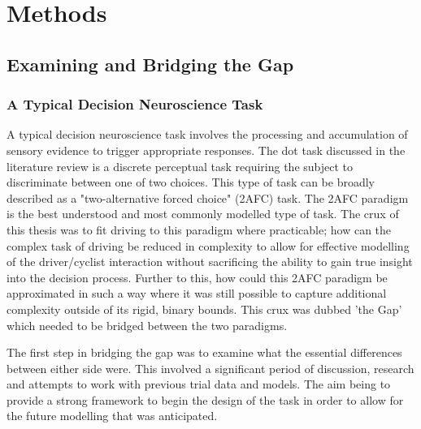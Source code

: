 \chapter{Methods}


\section{Examining and Bridging the Gap}
\subsection{A Typical Decision Neuroscience Task}
A typical decision neuroscience task involves the processing and accumulation of sensory evidence to trigger appropriate responses. The dot task discussed in the literature review is a discrete perceptual task requiring the subject to discriminate between one of two choices. This type of task can be broadly described as a "two-alternative forced choice" (2AFC) task. The 2AFC paradigm is the best understood and most commonly modelled type of task. The crux of this thesis was to fit driving to this paradigm where practicable; how can the complex task of driving be reduced in complexity to allow for effective modelling of the driver/cyclist interaction without sacrificing the ability to gain true insight into the decision process. Further to this, how could this 2AFC paradigm be approximated in such a way where it was still possible to capture additional complexity outside of its rigid, binary bounds. This crux was dubbed 'the Gap' which needed to be bridged between the two paradigms.

The first step in bridging the gap was to examine what the essential differences between either side were. This involved a significant period of discussion, research and attempts to work with previous trial data and models. The aim being to provide a strong framework to begin the design of the task in order to allow for the future modelling that was anticipated.

